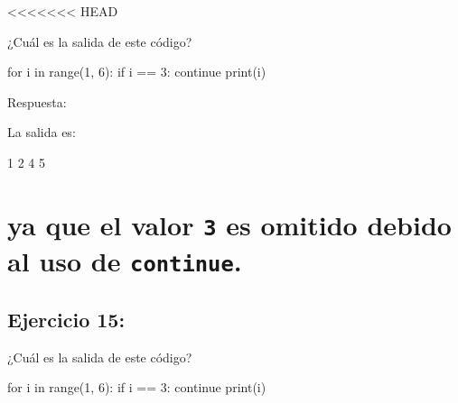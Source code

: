 \documentclass[
  a4paper,
  onepage,
  openany]{scrreprt}
\newenvironment{Shaded}{\begin{snugshade}}{\end{snugshade}}
\newcommand{\BuiltInTok}[1]{\textcolor[rgb]{0.00,0.23,0.31}{#1}}
\newcommand{\ControlFlowTok}[1]{\textcolor[rgb]{0.00,0.23,0.31}{#1}}
\newcommand{\DecValTok}[1]{\textcolor[rgb]{0.68,0.00,0.00}{#1}}
\newcommand{\ExtensionTok}[1]{\textcolor[rgb]{0.00,0.23,0.31}{#1}}
\newcommand{\KeywordTok}[1]{\textcolor[rgb]{0.00,0.23,0.31}{#1}}
\newcommand{\NormalTok}[1]{\textcolor[rgb]{0.00,0.23,0.31}{#1}}
\newcommand{\OperatorTok}[1]{\textcolor[rgb]{0.37,0.37,0.37}{#1}}
\begin{document}
\textless\textless\textless\textless\textless\textless\textless{} HEAD

¿Cuál es la salida de este código?

\begin{Shaded}
\begin{Highlighting}[]
\ControlFlowTok{for}\NormalTok{ i }\KeywordTok{in} \BuiltInTok{range}\NormalTok{(}\DecValTok{1}\NormalTok{, }\DecValTok{6}\NormalTok{):}
    \ControlFlowTok{if}\NormalTok{ i }\OperatorTok{==} \DecValTok{3}\NormalTok{:}
        \ControlFlowTok{continue}
    \BuiltInTok{print}\NormalTok{(i)}
\end{Highlighting}
\end{Shaded}

Respuesta:

La salida es:

\begin{Shaded}
\begin{Highlighting}[]
\ExtensionTok{1}
\ExtensionTok{2}
\ExtensionTok{4}
\ExtensionTok{5}
\end{Highlighting}
\end{Shaded}

\hypertarget{ya-que-el-valor-3-es-omitido-debido-al-uso-de-continue.}{%
\chapter{\texorpdfstring{ya que el valor \texttt{3} es omitido debido al
uso de
\texttt{continue}.}{ya que el valor 3 es omitido debido al uso de continue.}}\label{ya-que-el-valor-3-es-omitido-debido-al-uso-de-continue.}}

\hypertarget{ejercicio-15-1}{%
\section{Ejercicio 15:}\label{ejercicio-15-1}}

¿Cuál es la salida de este código?

\begin{Shaded}
\begin{Highlighting}[]
\ControlFlowTok{for}\NormalTok{ i }\KeywordTok{in} \BuiltInTok{range}\NormalTok{(}\DecValTok{1}\NormalTok{, }\DecValTok{6}\NormalTok{):}
    \ControlFlowTok{if}\NormalTok{ i }\OperatorTok{==} \DecValTok{3}\NormalTok{:}
        \ControlFlowTok{continue}
    \BuiltInTok{print}\NormalTok{(i)}
\end{Highlighting}
\end{Shaded}
\end{document}
